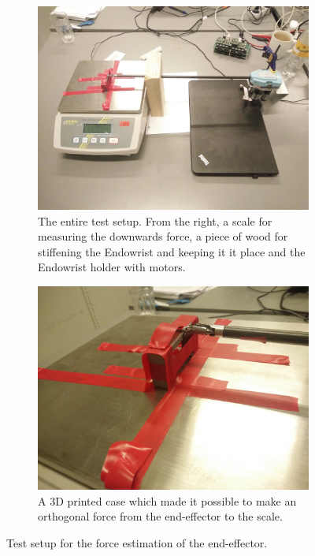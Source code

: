 \documentclass[conference]{IEEEtran}
\begin{document}
\begin{figure}
	\centering
	\begin{subfigure}{.45\linewidth}
		\centering
		\vspace{24pt}
		\includegraphics[width=\linewidth]{overall_force.jpg}
		\caption{The entire test setup. From the right, a scale for measuring the downwards force, a piece of wood for stiffening the Endowrist and keeping it it place and the Endowrist holder with motors.}
		\label{fig:entire_force_testsetup}
	\end{subfigure}
	\begin{subfigure}{.45\linewidth}
		\centering
		\includegraphics[width=\linewidth]{endeffector_force.jpg}
		\caption{A 3D printed case which made it possible to make an orthogonal force from the end-effector to the scale.}
		\label{fig:endeffector_force}
	\end{subfigure}
\caption{Test setup for the force estimation of the end-effector.}
\label{fig:Overview_force}
\end{figure}
\end{document}
